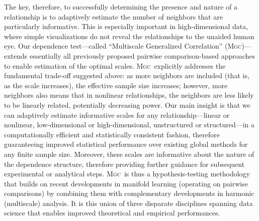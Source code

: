 \documentclass[11pt]{article}
\providecommand{\sct}[1]{{\normalfont\textsc{#1}}}
\newcommand{\Mgc}{\sct{Mgc}}
\begin{document}
The key, therefore, to successfully determining the presence and nature of a relationship is to adaptively estimate the number of neighbors that are particularly informative.
This is especially important in high-dimensional data, where simple visualizations do not reveal the relationships to the unaided human eye.
Our  dependence test---called ``Multiscale Generalized Correlation'' (\Mgc)---extends essentially all previously proposed pairwise comparison-based approaches to enable estimation of the  optimal scales.   
\Mgc~explicitly addresses the fundamental trade-off suggested above: as more neighbors are included (that is, as the scale increases), the effective sample size increases; however, more neighbors also means that in nonlinear relationships, the neighbors are less likely to be linearly related, potentially decreasing power.
{Our main insight is that we can adaptively estimate informative scales for any relationship---linear or nonlinear, low-dimensional or high-dimensional, unstructured or structured---in a computationally efficient and statistically consistent fashion, therefore guaranteeing improved statistical performance over existing global methods for any finite sample size.}
Moreover, these scales are informative about the nature of the dependence structure, therefore providing further guidance for subsequent experimental or analytical steps. \Mgc~is thus a hypothesis-testing methodology that builds on recent developments in manifold learning (operating on pairwise comparisons) by combining them with complementary developments in harmonic (multiscale) analysis. 
It is this union of three disparate disciplines spanning data science that enables improved theoretical and empirical performances. 
\end{document}
